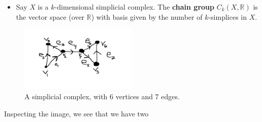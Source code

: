 \documentclass[12pt]{article}
\begin{document}
\begin{itemize}

  \item Say $X$ is a $k$-dimensional simplicial complex. The \textbf{chain group} $C_k(X,
    \mathbb{R})$ is the vector space (over $\mathbb{R}$) with basis given by the number of
    $k$-simplices in $X$. 

\end{itemize}

\begin{figure}[ht]
  \begin{center}
      \includegraphics[width=0.5\textwidth]{Simp_Cx.jpg}
  \end{center}
\caption{A simplicial complex, with 6 vertices and 7 edges.}
\end{figure}

Inspecting the image, we see that we have two 
\end{document}
